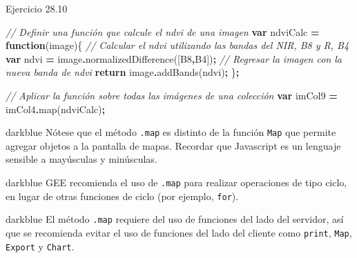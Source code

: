 \documentclass[
  12pt,
  letterpaper,
  twoside]{book}
\newenvironment{Shaded}{\begin{snugshade}}{\end{snugshade}}
\newcommand{\CommentTok}[1]{\textcolor[rgb]{0.56,0.35,0.01}{\textit{#1}}}
\newcommand{\ControlFlowTok}[1]{\textcolor[rgb]{0.13,0.29,0.53}{\textbf{#1}}}
\newcommand{\FunctionTok}[1]{\textcolor[rgb]{0.00,0.00,0.00}{#1}}
\newcommand{\KeywordTok}[1]{\textcolor[rgb]{0.13,0.29,0.53}{\textbf{#1}}}
\newcommand{\NormalTok}[1]{#1}
\newcommand{\OperatorTok}[1]{\textcolor[rgb]{0.81,0.36,0.00}{\textbf{#1}}}
\newcommand{\StringTok}[1]{\textcolor[rgb]{0.31,0.60,0.02}{#1}}
\begin{document}
Ejercicio 28.10

\begin{Shaded}
\begin{Highlighting}[]
\CommentTok{// Definir una función que calcule el ndvi de una imagen}
\KeywordTok{var}\NormalTok{ ndviCalc }\OperatorTok{=} \KeywordTok{function}\NormalTok{(image)\{}
  \CommentTok{// Calcular el ndvi utilizando las bandas del NIR, B8 y R, B4}
  \KeywordTok{var}\NormalTok{ ndvi }\OperatorTok{=}\NormalTok{ image}\OperatorTok{.}\FunctionTok{normalizedDifference}\NormalTok{([}\StringTok{\textquotesingle{}B8\textquotesingle{}}\OperatorTok{,}\StringTok{\textquotesingle{}B4\textquotesingle{}}\NormalTok{])}\OperatorTok{;}
  \CommentTok{// Regresar la imagen con la nueva banda de ndvi}
  \ControlFlowTok{return}\NormalTok{ image}\OperatorTok{.}\FunctionTok{addBands}\NormalTok{(ndvi)}\OperatorTok{;}
\NormalTok{\}}\OperatorTok{;}

\CommentTok{// Aplicar la función sobre todas las imágenes de una colección}
\KeywordTok{var}\NormalTok{ imCol9 }\OperatorTok{=}\NormalTok{ imCol4}\OperatorTok{.}\FunctionTok{map}\NormalTok{(ndviCalc)}\OperatorTok{;}
\end{Highlighting}
\end{Shaded}

\begin{bluebox2}

\begin{awesomeblock}{5pt}{\faLightbulb}{darkblue}
Nótese que el método \texttt{.map} es distinto de la función \texttt{Map} que permite agregar objetos a la pantalla de mapas. Recordar que Javascript es un lenguaje sensible a mayúsculas y minúsculas.

\end{awesomeblock}

\end{bluebox2}

\begin{bluebox2}

\begin{awesomeblock}{5pt}{\faLightbulb}{darkblue}
GEE recomienda el uso de \texttt{.map} para realizar operaciones de tipo ciclo, en lugar de otras funciones de ciclo (por ejemplo, \texttt{for}).

\end{awesomeblock}

\end{bluebox2}

\begin{bluebox2}

\begin{awesomeblock}{5pt}{\faLightbulb}{darkblue}
El método \texttt{.map} requiere del uso de funciones del lado del servidor, así que se recomienda evitar el uso de funciones del lado del cliente como \texttt{print}, \texttt{Map}, \texttt{Export} y \texttt{Chart}.

\end{awesomeblock}

\end{bluebox2}
\end{document}
